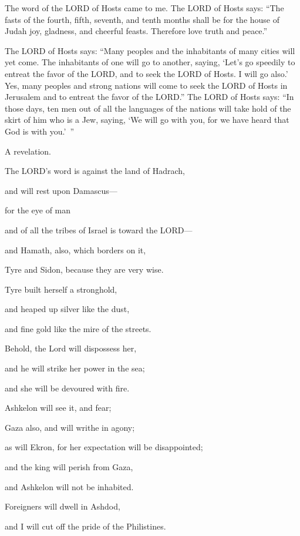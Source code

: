 \myverse{}The word of the LORD of Hosts came to me.
\myverse{}The LORD of Hosts says: “The fasts of the fourth, fifth, seventh, and tenth
months shall be for the house of Judah joy, gladness, and cheerful feasts. Therefore love truth and peace.”

\myverse{}The LORD of Hosts says: “Many peoples and the inhabitants of
many cities will yet come.
\myverse{}The inhabitants of one will go to another, saying, ‘Let’s go speedily to entreat
the favor of the LORD, and to seek the LORD of Hosts. I will go also.’
\myverse{}Yes, many peoples and strong nations will come to seek the LORD of Hosts in
Jerusalem and to entreat the favor of the LORD.”
\myverse{}The LORD of Hosts says: “In those days, ten men out of all the languages of
the nations will take hold of the skirt of him who is a Jew, saying, ‘We will go with you, for we have
heard that God is with you.’ ”


\mychapter{} \myverse*{}A revelation.

The LORD’s word is against the land of Hadrach,

and will rest upon Damascus—

for the eye of man

and of all the tribes of Israel is toward the LORD—

\myverse{}and Hamath, also, which borders on it,

Tyre and Sidon, because they are very wise.

\myverse{}Tyre built herself a stronghold,

and heaped up silver like the dust,

and fine gold like the mire of the streets.

\myverse{}Behold, the Lord will dispossess her,

and he will strike her power in the sea;

and she will be devoured with fire.


\vspace{\baselineskip} \myverse{}Ashkelon will see it, and fear;

Gaza also, and will writhe in agony;

as will Ekron, for her expectation will be disappointed;

and the king will perish from Gaza,

and Ashkelon will not be inhabited.

\myverse{}Foreigners will dwell in Ashdod,

and I will cut off the pride of the Philistines.

